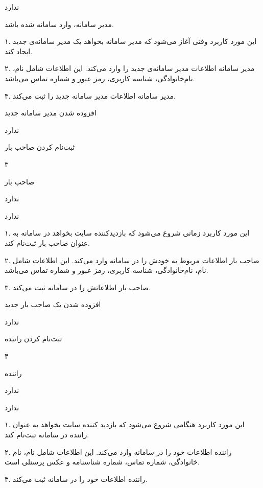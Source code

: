 ندارد

مدیر سامانه، وارد سامانه شده باشد.


۱. این مورد کاربرد وقتی آغاز می‌شود که مدیر سامانه بخواهد یک مدیر سامانه‌ی جدید ایجاد کند.

۲. مدیر سامانه اطلاعات مدیر سامانه‌ی جدید را وارد می‌کند. این اطلاعات شامل نام، نام‌خانوادگی، شناسه کاربری، رمز عبور و شماره تماس می‌باشد.

۳. مدیر سامانه اطلاعات مدیر سامانه جدید را ثبت می‌کند.

افزوده شدن مدیر سامانه جدید

ندارد


\noindent \hrulefill

ثبت‌نام کردن صاحب بار

۳

صاحب بار

ندارد

ندارد


۱. این مورد کاربرد زمانی شروع می‌شود که بازدیدکننده سایت بخواهد در سامانه به عنوان صاحب بار ثبت‌نام کند.

۲. صاحب بار اطلاعات مربوط به خودش را در سامانه وارد می‌کند. این اطلاعات شامل نام، نام‌خانوادگی، شناسه کاربری، رمز عبور و شماره تماس می‌باشد.

۳. صاحب بار اطلاعاتش را در سامانه ثبت می‌کند.

افزوده شدن یک صاحب بار جدید

ندارد

\noindent \hrulefill

ثبت‌نام کردن راننده

۴

راننده

ندارد

ندارد


۱. این مورد کاربرد هنگامی شروع می‌شود که بازدید کننده سایت بخواهد به عنوان راننده در سامانه ثبت‌نام کند.

۲. راننده اطلاعات خود را در سامانه وارد می‌کند. این اطلاعات شامل نام، نام خانوادگی، شماره تماس، شماره شناسنامه و عکس پرسنلی است.

۳. راننده اطلاعات خود را در سامانه ثبت می‌کند.

